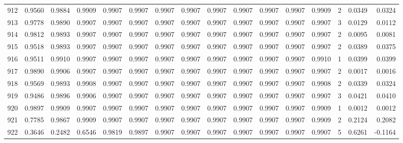 \begin{tabular}{lrrrrrrrrrrrrrrr}
912 &      0.9560 &  0.9884 &  0.9909 &  0.9907 &  0.9907 &  0.9907 &  0.9907 &  0.9907 &  0.9907 &  0.9907 &   0.9907 &     0.9909 &      2 &                    0.0349 &                     0.0324 \\
913 &      0.9778 &  0.9890 &  0.9907 &  0.9907 &  0.9907 &  0.9907 &  0.9907 &  0.9907 &  0.9907 &  0.9907 &   0.9907 &     0.9907 &      3 &                    0.0129 &                     0.0112 \\
914 &      0.9812 &  0.9893 &  0.9907 &  0.9907 &  0.9907 &  0.9907 &  0.9907 &  0.9907 &  0.9907 &  0.9907 &   0.9907 &     0.9907 &      2 &                    0.0095 &                     0.0081 \\
915 &      0.9518 &  0.9893 &  0.9907 &  0.9907 &  0.9907 &  0.9907 &  0.9907 &  0.9907 &  0.9907 &  0.9907 &   0.9907 &     0.9907 &      2 &                    0.0389 &                     0.0375 \\
916 &      0.9511 &  0.9910 &  0.9907 &  0.9907 &  0.9907 &  0.9907 &  0.9907 &  0.9907 &  0.9907 &  0.9907 &   0.9907 &     0.9910 &      1 &                    0.0399 &                     0.0399 \\
917 &      0.9890 &  0.9906 &  0.9907 &  0.9907 &  0.9907 &  0.9907 &  0.9907 &  0.9907 &  0.9907 &  0.9907 &   0.9907 &     0.9907 &      2 &                    0.0017 &                     0.0016 \\
918 &      0.9569 &  0.9893 &  0.9908 &  0.9907 &  0.9907 &  0.9907 &  0.9907 &  0.9907 &  0.9907 &  0.9907 &   0.9907 &     0.9908 &      2 &                    0.0339 &                     0.0324 \\
919 &      0.9486 &  0.9896 &  0.9906 &  0.9907 &  0.9907 &  0.9907 &  0.9907 &  0.9907 &  0.9907 &  0.9907 &   0.9907 &     0.9907 &      3 &                    0.0421 &                     0.0410 \\
920 &      0.9897 &  0.9909 &  0.9907 &  0.9907 &  0.9907 &  0.9907 &  0.9907 &  0.9907 &  0.9907 &  0.9907 &   0.9907 &     0.9909 &      1 &                    0.0012 &                     0.0012 \\
921 &      0.7785 &  0.9867 &  0.9909 &  0.9907 &  0.9907 &  0.9907 &  0.9907 &  0.9907 &  0.9907 &  0.9907 &   0.9907 &     0.9909 &      2 &                    0.2124 &                     0.2082 \\
922 &      0.3646 &  0.2482 &  0.6546 &  0.9819 &  0.9897 &  0.9907 &  0.9907 &  0.9907 &  0.9907 &  0.9907 &   0.9907 &     0.9907 &      5 &                    0.6261 &                    -0.1164 \\

\end{tabular}
